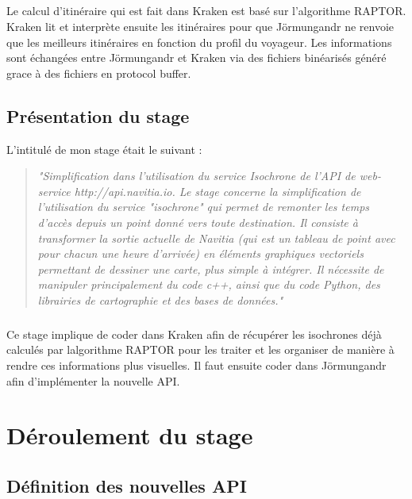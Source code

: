 \documentclass[a4paper]{report}
\begin{document}
\paragraph{} Le calcul d'itinéraire qui est fait dans Kraken est basé sur l'algorithme RAPTOR. Kraken lit et interprète ensuite les itinéraires pour que Jörmungandr ne renvoie que les meilleurs itinéraires en fonction du profil du voyageur. Les informations sont échangées entre Jörmungandr et Kraken via des fichiers binéarisés généré grace à des fichiers en protocol buffer.

\section{Présentation du stage}

L'intitulé de mon stage était le suivant :

\begin{quote}
	\emph{"Simplification dans l’utilisation du service Isochrone de l’API de web-service http://api.navitia.io. Le stage concerne la simplification de l’utilisation du service 		"isochrone" qui permet de remonter les temps d'accès depuis un point donné vers toute destination. Il consiste à transformer la sortie actuelle de Navitia (qui est un tableau de 		point avec pour chacun une heure d'arrivée) en éléments graphiques vectoriels permettant de dessiner une carte, plus simple à intégrer. Il nécessite de manipuler principalement du 		code c++, ainsi que du code Python, des librairies de cartographie et des bases de données."}
\end{quote}

\paragraph{} Ce stage implique de coder dans Kraken afin de récupérer les isochrones déjà calculés par lalgorithme RAPTOR pour les traiter et les organiser de manière à rendre ces informations plus visuelles. Il faut ensuite coder dans Jörmungandr afin d'implémenter la nouvelle API. 

\chapter{Déroulement du stage}

\section{Définition des nouvelles API}
\end{document}
